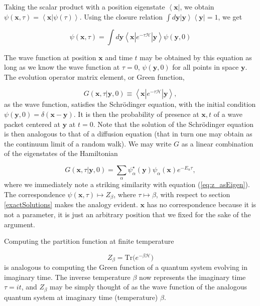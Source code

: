 Taking the scalar product with a position eigenstate $ \left\langle \bm x \right|$, we obtain $\psi (\bm x, \tau) = \left\langle \bm x | \psi (\tau) \right\rangle$. Using the closure relation $\int d\bm y \left| \bm y \right\rangle  \left\langle \bm y \right| = 1$, we get

\begin{equation}
\psi ( \bm x , \tau ) = \int d\bm y \left\langle \bm x | e^{-\tau \mathcal{H}} | \bm y \right\rangle \psi (\bm y, 0)
\end{equation}

The wave function at position $\bm x$ and time $t$ may be obtained by this equation as long as we know the wave function at $\tau = 0$, $\psi (\bm y, 0)$ for all points in space $\bm y$. The evolution operator matrix element, or Green function, 

\begin{equation}
G ( \bm x, \tau | \bm y, 0 ) \equiv \left\langle \bm x | e^{-\tau \mathcal{H}} | \bm y \right\rangle ,
\end{equation}
as the wave function, satisfies the Schr\"odinger equation, with the initial condition $\psi (\bm y, 0) = \delta (\bm x - \bm y )$. It is then the probability of presence at $\bm x, t$ of a wave packet centered at $\bm y$ at $t = 0$. Note that the solution of the Schr\"odinger equation is then analogous to that of a diffusion equation (that in turn one may obtain as the continuum limit of a random walk). We may write $G$ as a linear combination of the eigenstates of the Hamiltonian

\begin{equation}
G (\bm x, \tau | \bm y, 0) = \sum_\alpha \psi_\alpha^\star (\bm y) \psi_\alpha (\bm x) e^{-E_\alpha \tau} ,
\end{equation}
where we immediately note a striking similarity with equation (\ref{eq:z_asEigen}). The correspondence $\psi (\bm x, \tau) \mapsto Z_\beta$, where $\tau \mapsto \beta$, with respect to section \ref{exactSolutions} makes the analogy evident. $\bm x$ has no correspondence because it is not a parameter, it is just an arbitrary position that we fixed for the sake of the argument.

Computing the partition function at finite temperature

\begin{equation}
Z_\beta = \text{Tr} \big( e^{-\beta \mathcal{H} } \big)
\end{equation}
is analogous to computing the Green function of a quantum system evolving in imaginary time. The inverse temperature $\beta$ now represents the imaginary time $\tau = it$, and $Z_\beta$ may be simply thought of as the wave function of the analogous quantum system at imaginary time (temperature) $\beta$.
 
